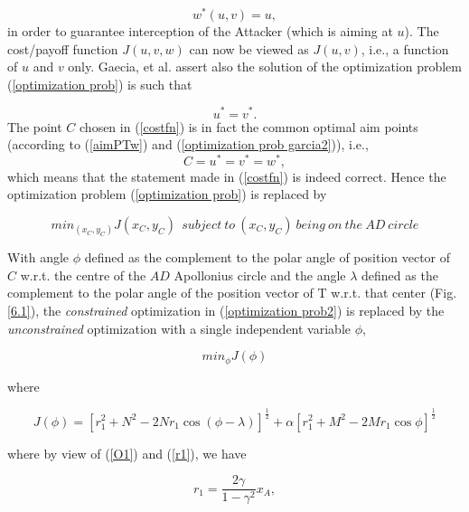 \begin{equation}
w^*(u,v) = u,
\label{aimPTw}
\end{equation}
in order to guarantee interception of the Attacker (which is aiming at $u$). The cost/payoff function $J(u,v,w)$ can now be viewed as $J(u,v)$, i.e., a function of $u$ and $v$ only. Gaecia, et al. \cite{garcia2015active} assert also the solution of the optimization problem (\ref{optimization prob}) is such that

\begin{equation}
u^*=v^*.
\label{optimization prob garcia2}
\end{equation}
The point $C$ chosen in (\ref{costfn}) is in fact the common optimal aim points (according to (\ref{aimPTw}) and (\ref{optimization prob garcia2})), i.e.,
\begin{equation}
C=u^*=v^*=w^*,
\label{C}
\end{equation}
which means that the statement made in (\ref{costfn}) is indeed correct. Hence the optimization problem (\ref{optimization prob}) is replaced by 

\begin{equation}
min_{(x_C,y_C)}J(x_C,y_C)\  \ subject\ to\ (x_C,y_C)\ being\ on\ the\ AD\ circle
\label{optimization prob2}
\end{equation}  

With angle $\phi$ defined as the complement to the polar angle of position vector of $C$ w.r.t. the centre of the $AD$ Apollonius circle and the angle $\lambda$ defined as the complement to the polar angle of the position vector of T w.r.t. that center (Fig. \ref{6.1}), the \textit{constrained} optimization in (\ref{optimization prob2}) is replaced by the \textit{unconstrained} optimization \cite{garcia2015active} with a single independent variable $\phi$,

\begin{equation}
min_{\phi} J(\phi)
\label{phiOptim}
\end{equation}    

where 

\begin{equation}
J(\phi)=[r_1^2+N^2-2Nr_1 \cos(\phi-\lambda)]^{\frac{1}{2}}
+\alpha[r_1^2+M^2-2Mr_1 \cos\phi]^{\frac{1}{2}}
\label{cost-fun-sub}
\end{equation}

where by view of (\ref{O1}) and (\ref{r1}), we have

\begin{equation}
r_1=\dfrac{2\gamma}{1-\gamma^2} x_A,
\end{equation}

